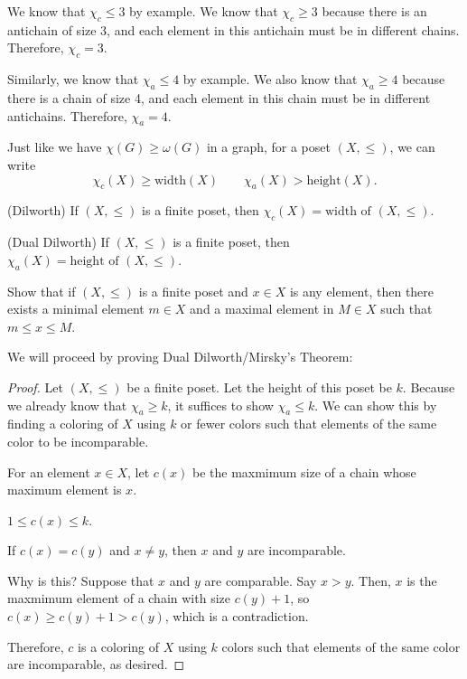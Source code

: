 \documentclass[a4paper]{article}
\begin{document}
We know that \( \chi_c \le 3 \) by example. We know that \( \chi_c \ge 3 \) because there is an antichain of size 3, and each element in this antichain must be in different chains. Therefore, \( \chi_c = 3 \).

Similarly, we know that \( \chi_a \le 4 \) by example. We also know that \( \chi_a \ge 4 \) because there is a chain of size 4, and each element in this chain must be in different antichains. Therefore, \( \chi_a = 4 \).

\begin{note}
	Just like we have \( \chi(G) \ge \omega(G) \) in a graph, for a poset \( (X, \le ) \), we can write \[
		\chi_c(X) \ge \text{width}(X) \qquad \chi_a(X) > \text{height}(X)
	.\] 
\end{note}

\begin{theorem}
	(Dilworth) If \( (X, \le ) \) is a finite poset, then \( \chi_c(X) = \text{width of } (X,\le )\).
\end{theorem}

\begin{theorem}
	(Dual Dilworth) If \( (X, \le ) \) is a finite poset, then \( \chi_a(X) = \text{height of } (X,\le )\).
\end{theorem}

Show that if \( (X,\le ) \) is a finite poset and \( x \in X \) is any element, then there exists a minimal element \( m \in X \) and a maximal element in \( M \in X \) such that \( m \le x \le M \).


We will proceed by proving Dual Dilworth/Mirsky's Theorem:

\begin{proof}
	Let \( (X,\le ) \) be a finite poset. Let the height of this poset be \( k \). Because we already know that \( \chi_a \ge k \), it suffices to show \( \chi_a \le k \). We can show this by finding a coloring of \( X \) using \( k \) or fewer colors such that elements of the same color to be incomparable.

	For an element \( x \in X \), let \( c(x) \) be the maxmimum size of a chain whose maximum element is \( x \). 
	\begin{observe}
		\( 1 \le c(x) \le k \).
	\end{observe}
	\begin{observe}
		If \( c(x) = c(y) \) and \( x\neq y \), then \( x \) and \( y \) are incomparable.
	\end{observe}
	Why is this? Suppose that \( x \) and \( y \) are comparable. Say \( x > y \). Then, \( x \) is the maxmimum element of a chain with size \( c(y)+1 \), so \( c(x) \ge c(y)+1 > c(y) \), which is a contradiction.

	Therefore, \( c \) is a coloring of \( X \) using \( k \) colors such that elements of the same color are incomparable, as desired.
\end{proof}
\end{document}
